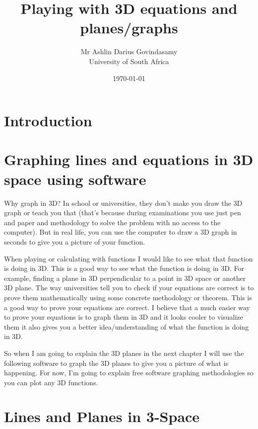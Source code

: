 \documentclass{report}
\title{Playing with 3D equations and planes/graphs}
\author{Mr Ashlin Darius Govindasamy\\ \large{University of South Africa}}
\date{\today}
\begin{document}
\maketitle
\newpage

\tableofcontents


\chapter*{Introduction}


\chapter{Graphing lines and equations in 3D space using software}
Why graph in 3D? In school or universities, they don't make you draw the 3D graph or teach you that (that's because during examinations you use just pen and paper and methodology to solve the problem with no access to the computer). But in real life, you can use the computer to draw a 3D graph in seconds to give you a picture of your function.

When playing or calculating with functions I would like to see what that function is doing in 3D. This is a good way to see what the function is doing in 3D. For example, finding a plane in 3D perpendicular to a point in 3D space or another 3D plane. The way universities tell you to check if your equations are correct is to prove them mathematically using some concrete methodology or theorem. This is a good way to prove your equations are correct.
I believe that a much easier way to prove your equations is to graph them in 3D and it looks cooler to visualize them it also gives you a better idea/understanding of what the function is doing in 3D.

So when I am going to explain the 3D planes in the next chapter I will use the following software to graph the 3D planes to give you a picture of what is happening. For now, I'm going to explain free software graphing methodologies so you can plot any 3D functions.



\chapter{Lines and Planes in 3-Space}


\newpage
\end{document}
